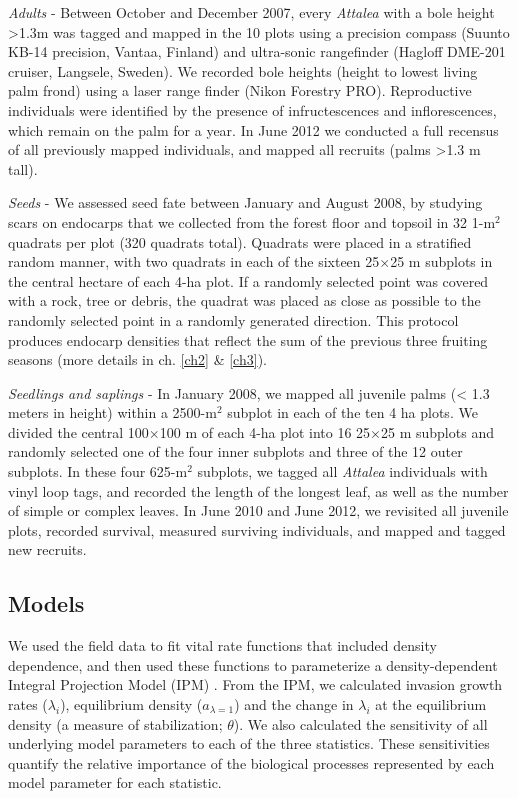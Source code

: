 \documentclass[b5paper,justified]{tufte-book} %
\begin{document}
\begin{fullwidth}
\textit{Adults} - Between October and December 2007, every \textit{Attalea} with a bole height >1.3m was tagged and mapped in the 10 plots using a precision compass (Suunto KB-14 precision, Vantaa, Finland) and ultra-sonic rangefinder (Hagloff DME-201 cruiser, Langsele, Sweden). We recorded bole heights (height to lowest living palm frond) using a laser range finder (Nikon Forestry PRO). Reproductive individuals were identified by the presence of infructescences and inflorescences, which remain on the palm for a year. In June 2012 we conducted a full recensus of all previously mapped individuals, and mapped all recruits (palms >1.3 m tall).

\textit{Seeds} - We assessed seed fate between January and August 2008, by studying scars on endocarps that we collected from the forest floor and topsoil in 32 1-m$^2$ quadrats per plot (320 quadrats total). Quadrats were placed in a stratified random manner, with two quadrats in each of the sixteen 25$\times$25 m subplots in the central hectare of each 4-ha plot. If a randomly selected point was covered with a rock, tree or debris, the quadrat was placed as close as possible to the randomly selected point in a randomly generated direction. This protocol produces endocarp densities that reflect the sum of the previous three fruiting seasons (more details in ch. \ref{ch2} \& \ref{ch3}). 

\textit{Seedlings and saplings} - In January 2008, we mapped all juvenile palms (< 1.3 meters in height) within a 2500-m$^2$ subplot in each of the ten 4 ha plots. We divided the central 100$\times$100 m of each 4-ha plot into 16 25$\times$25 m subplots and randomly selected one of the four inner subplots and three of the 12 outer subplots. In these four 625-m$^2$ subplots, we tagged all \textit{Attalea} individuals with vinyl loop tags, and recorded the length of the longest leaf, as well as the number of simple or complex leaves. In June 2010 and June 2012, we revisited all juvenile plots, recorded survival, measured surviving individuals, and mapped and tagged new recruits.   


\subsection{Models} 
We used the field data to fit vital rate functions that included density dependence, and then used these functions to parameterize a density-dependent Integral Projection Model (IPM) \citep{Easterling2000, Zuidema2010}. From the IPM, we calculated invasion growth rates ($\lambda_i$), equilibrium density ($a_{\lambda=1}$) and the change in $\lambda_i$ at the equilibrium density (a measure of stabilization; $\theta$). We also calculated the sensitivity of all underlying model parameters to each of the three statistics.  These sensitivities quantify the relative importance of the biological processes represented by each model parameter for each statistic. 


\end{fullwidth}
\end{document}
